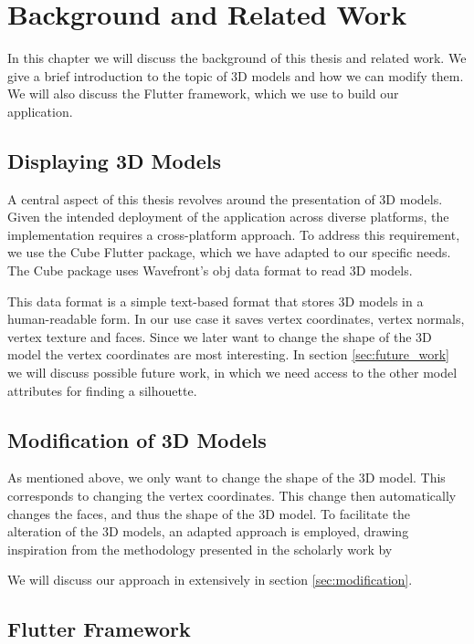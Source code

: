 \setcounter{chapter}{1}

\chapter{Background and Related Work}\label{ch02-related-work}

In this chapter we will discuss the background of this thesis and related work. We give a brief introduction to the topic of 3D models and how we can modify them. We will also discuss the Flutter framework, which we use to build our application.


\section{Displaying 3D Models}

A central aspect of this thesis revolves around the presentation of 3D models. Given the intended deployment of the application across diverse platforms, the implementation requires a cross-platform approach. 
To address this requirement, we use the Cube Flutter package, which we have adapted to our specific needs. The Cube package uses Wavefront's obj data format to read 3D models.

This data format is a simple text-based format that stores 3D models in a human-readable form. In our use case it saves vertex coordinates, vertex normals, vertex texture and faces. Since we later want to change
the shape of the 3D model the vertex coordinates are most interesting.
In section \ref{sec:future_work} we will discuss possible future work, in which we need access to the other model attributes for finding a silhouette.


\section{Modification of 3D Models}
As mentioned above, we only want to change the shape of the 3D model. This corresponds to changing the vertex coordinates. This change then automatically changes the faces, and thus the shape of the 3D model.
To facilitate the alteration of the 3D models, an adapted approach is employed, drawing inspiration from the methodology presented in the scholarly work by \cite{rychlik2008applications}

We will discuss our approach in extensively in section \ref{sec:modification}.

\section{Flutter Framework}

